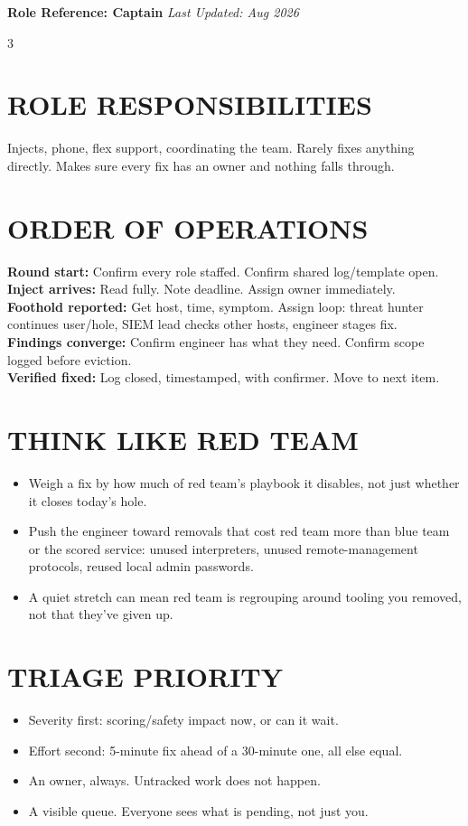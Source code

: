 \documentclass[7pt,landscape]{article}
\begin{document}
\textbf{Role Reference: Captain} \hfill \textit{Last Updated: Aug 2026}
\raggedcolumns
\begin{multicols*}{3}

\section{ROLE RESPONSIBILITIES}
Injects, phone, flex support, coordinating the team. Rarely fixes anything directly. Makes sure every fix has an owner and nothing falls through.

\section{ORDER OF OPERATIONS}
\textbf{Round start:} Confirm every role staffed. Confirm shared log/template open. \\
\textbf{Inject arrives:} Read fully. Note deadline. Assign owner immediately. \\
\textbf{Foothold reported:} Get host, time, symptom. Assign loop: threat hunter continues user/hole, SIEM lead checks other hosts, engineer stages fix. \\
\textbf{Findings converge:} Confirm engineer has what they need. Confirm scope logged before eviction. \\
\textbf{Verified fixed:} Log closed, timestamped, with confirmer. Move to next item.

\section{THINK LIKE RED TEAM}
\begin{itemize}
    \item Weigh a fix by how much of red team's playbook it disables, not just whether it closes today's hole.
    \item Push the engineer toward removals that cost red team more than blue team or the scored service: unused interpreters, unused remote-management protocols, reused local admin passwords.
    \item A quiet stretch can mean red team is regrouping around tooling you removed, not that they've given up.
\end{itemize}

\section{TRIAGE PRIORITY}
\begin{itemize}
    \item Severity first: scoring/safety impact now, or can it wait.
    \item Effort second: 5-minute fix ahead of a 30-minute one, all else equal.
    \item An owner, always. Untracked work does not happen.
    \item A visible queue. Everyone sees what is pending, not just you.
\end{itemize}


\end{multicols*}
\end{document}
